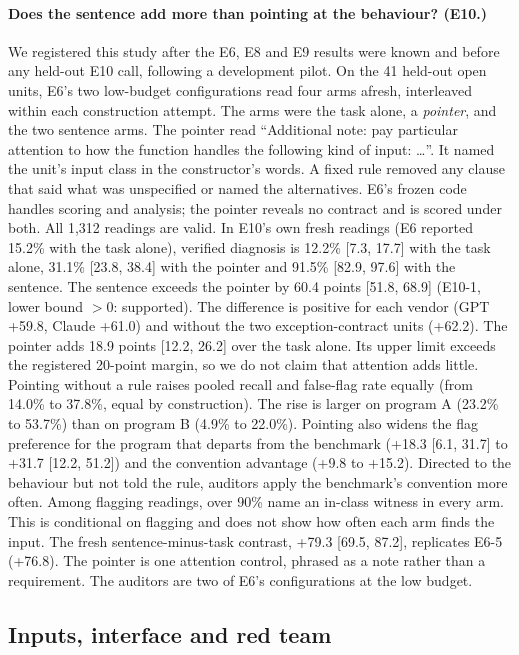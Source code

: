 \paragraph{Does the sentence add more than pointing at the behaviour? (E10.)} We registered this study
after the E6, E8 and E9 results were known and before any held-out E10 call, following a development
pilot. On the 41 held-out open units, E6's two low-budget configurations read four arms afresh,
interleaved within each construction attempt. The arms were the task alone, a \emph{pointer}, and the two
sentence arms. The pointer read ``Additional note: pay particular attention to how the function handles
the following kind of input: \dots''. It named the unit's input class in the constructor's words. A fixed
rule removed any clause that said what was unspecified or named the alternatives. E6's frozen code
handles scoring and analysis; the pointer reveals no contract and is scored under both. All 1{,}312
readings are valid. In E10's own fresh readings (E6 reported 15.2\% with the task alone), verified diagnosis is 12.2\% [7.3, 17.7] with the task alone, 31.1\% [23.8, 38.4]
with the pointer and 91.5\% [82.9, 97.6] with the sentence. The sentence exceeds the pointer by 60.4
points [51.8, 68.9] (E10-1, lower bound $>0$: supported). The difference is positive for each vendor (GPT
+59.8, Claude +61.0) and without the two exception-contract units (+62.2). The pointer adds 18.9 points
[12.2, 26.2] over the task alone. Its upper limit exceeds the registered 20-point margin, so we do not
claim that attention adds little. Pointing without a rule raises pooled recall and false-flag rate
equally (from 14.0\% to 37.8\%, equal by construction). The rise is larger on program A (23.2\% to
53.7\%) than on program B (4.9\% to 22.0\%). Pointing also widens the flag preference for the program
that departs from the benchmark (+18.3 [6.1, 31.7] to +31.7 [12.2, 51.2]) and the convention advantage
(+9.8 to +15.2). Directed to the behaviour but not told the rule, auditors apply the benchmark's
convention more often. Among flagging readings, over 90\% name an in-class witness in every arm. This is
conditional on flagging and does not show how often each arm finds the input. The fresh
sentence-minus-task contrast, +79.3 [69.5, 87.2], replicates E6-5 (+76.8). The pointer is one attention
control, phrased as a note rather than a requirement. The auditors are two of E6's configurations at the
low budget.

\subsection{Inputs, interface and red team}

